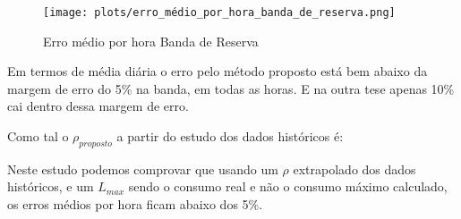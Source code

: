 \begin{figure}[H]
    \centering
    \texttt{[image: plots/erro\_médio\_por\_hora\_banda\_de\_reserva.png]}
    \caption{Erro médio por hora Banda de Reserva}
\end{figure}

Em termos de média diária o erro pelo método proposto está bem abaixo da margem de erro do 5\% na banda, em todas as horas. E na outra tese apenas 10\% cai dentro dessa margem de erro.\par

Como tal o $\rho_{proposto}$ a partir do estudo dos dados  históricos é: \

\begin{table}[H] \centering \caption{Valores de $\rho$ propostos}  \end{table}








Neste estudo podemos comprovar que usando um $\rho$ extrapolado dos dados históricos, e um $L_{max}$ sendo o consumo real e não o consumo máximo calculado, os erros médios por hora ficam abaixo dos 5\%.\par